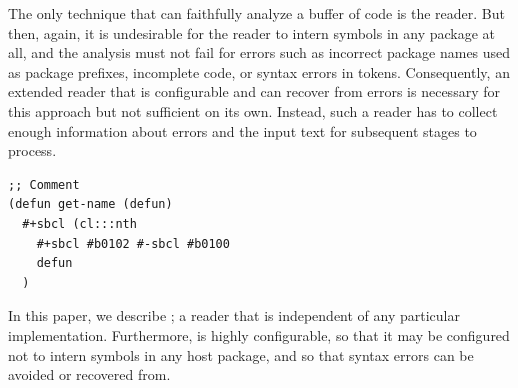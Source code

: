 \begin{description}
  The only technique that can faithfully analyze a buffer of \cl{}
  code is the \cl{} reader.  But then, again, it is undesirable for
  the reader to intern symbols in any package at all, and the analysis
  must not fail for errors such as incorrect package names used as
  package prefixes, incomplete code, or syntax errors in tokens.
  Consequently, an extended \cl{} reader that is configurable and can
  recover from errors is necessary for this approach but not
  sufficient on its own.  Instead, such a reader has to collect enough
  information about errors and the input text for subsequent stages to
  process.
\end{description}

\begin{listing}
\begin{verbatim}
;; Comment
(defun get-name (defun)
  #+sbcl (cl:::nth
    #+sbcl #b0102 #-sbcl #b0100
    defun
  )
\end{verbatim}
\caption{A \cl{} program with multiple errors and style issues that a
  user could type into an editor buffer.}
\label{lis:bad-program}
\end{listing}

\noindent
In this paper, we describe \eclector{}; a \cl{} reader that is
independent of any particular \cl{} implementation.  Furthermore,
\eclector{} is highly configurable, so that it may be configured not
to intern symbols in any host package, and so that syntax errors can
be avoided or recovered from.

